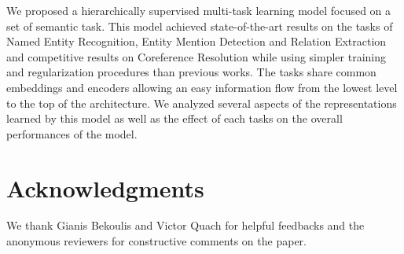 \documentclass[letterpaper]{article} \usepackage{aaai19}  \usepackage{times}  \usepackage{helvet}  \usepackage{courier}  \usepackage{url}  \usepackage{graphicx}  \usepackage{todonotes}
\begin{document}
We proposed a hierarchically supervised multi-task learning model focused on a set of semantic task. This model achieved state-of-the-art results on the tasks of Named Entity Recognition, Entity Mention Detection and Relation Extraction and competitive results on Coreference Resolution while using simpler training and regularization procedures than previous works. The tasks share common embeddings and encoders allowing an easy information flow from the lowest level to the top of the architecture. We analyzed several aspects of the representations learned by this model as well as the effect of each tasks on the overall performances of the model.

\section{Acknowledgments}

We thank Gianis Bekoulis and Victor Quach for helpful feedbacks and the anonymous reviewers for constructive comments on the paper.

\fontsize{9.0pt}{10.0pt} \selectfont
 

\end{document}
